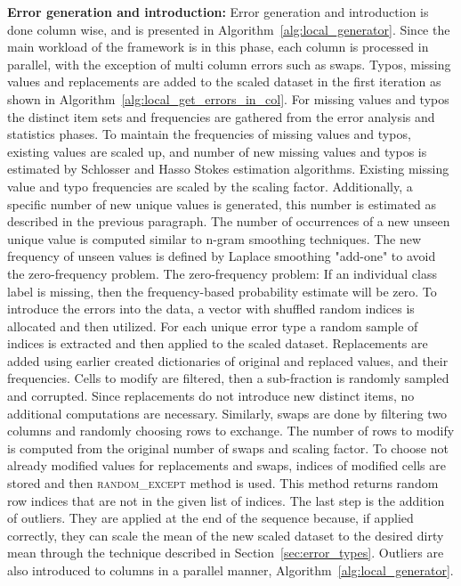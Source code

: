 \textbf{Error generation and introduction:} 
Error generation and introduction is done column wise, and is presented in Algorithm~\ref{alg:local_generator}. 
Since the main workload of the framework is in this phase, each column is processed in parallel, with the exception of multi column errors such as swaps.
Typos, missing values and replacements are added to the scaled dataset in the first iteration as shown in Algorithm~\ref{alg:local_get_errors_in_col}.
For missing values and typos the distinct item sets and frequencies are gathered from the error analysis and statistics phases. 
To maintain the frequencies of missing values and typos, existing values are scaled up, and number of new missing values and typos is estimated by Schlosser \cite{HassNSS1995} and Hasso Stokes \cite{HassS1998} estimation algorithms.
Existing missing value and typo frequencies are scaled by the scaling factor. 
Additionally, a specific number of new unique values is generated, this number is estimated as described in the previous paragraph.
The number of occurrences of a new unseen unique value is computed similar to n-gram smoothing techniques. 
The new frequency of unseen values is defined by Laplace smoothing "add-one" to avoid the zero-frequency problem.
The zero-frequency problem: If an individual class label is missing, then the frequency-based probability estimate will be zero.
To introduce the errors into the data, a vector with shuffled random indices is allocated and then utilized. 
For each unique error type a random sample of indices is extracted and then applied to the scaled dataset.
Replacements are added using earlier created dictionaries of original and replaced values, and their frequencies.
Cells to modify are filtered, then a sub-fraction is randomly sampled and corrupted.
Since replacements do not introduce new distinct items, no additional computations are necessary.
Similarly, swaps are done by filtering two columns and randomly choosing rows to exchange. 
The number of rows to modify is computed from the original number of swaps and scaling factor.
To choose not already modified values for replacements and swaps, indices of modified cells are stored and then \textsc{random\_except} method is used.
This method returns random row indices that are not in the given list of indices.
The last step is the addition of outliers. 
They are applied at the end of the sequence because, if applied correctly, they can scale the mean of the new scaled dataset to the desired dirty mean through the technique described in Section~\ref{sec:error_types}. 
Outliers are also introduced to columns in a parallel manner, Algorithm~\ref{alg:local_generator}.

